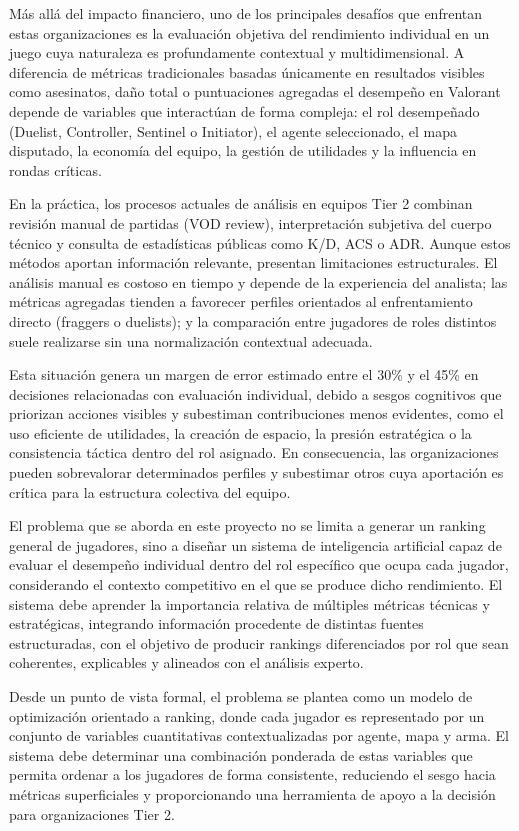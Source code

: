 \documentclass{ULBreport} %
\begin{document}
Más allá del impacto financiero, uno de los principales desafíos que enfrentan estas organizaciones es la evaluación objetiva del rendimiento individual en un juego cuya naturaleza es profundamente contextual y multidimensional. A diferencia de métricas tradicionales basadas únicamente en resultados visibles como asesinatos, daño total o puntuaciones agregadas el desempeño en Valorant depende de variables que interactúan de forma compleja: el rol desempeñado (Duelist, Controller, Sentinel o Initiator), el agente seleccionado, el mapa disputado, la economía del equipo, la gestión de utilidades y la influencia en rondas críticas.

En la práctica, los procesos actuales de análisis en equipos Tier 2 combinan revisión manual de partidas (VOD review), interpretación subjetiva del cuerpo técnico y consulta de estadísticas públicas como K/D, ACS o ADR. Aunque estos métodos aportan información relevante, presentan limitaciones estructurales. El análisis manual es costoso en tiempo y depende de la experiencia del analista; las métricas agregadas tienden a favorecer perfiles orientados al enfrentamiento directo (fraggers o duelists); y la comparación entre jugadores de roles distintos suele realizarse sin una normalización contextual adecuada.

Esta situación genera un margen de error estimado entre el 30\% y el 45\% en decisiones relacionadas con evaluación individual, debido a sesgos cognitivos que priorizan acciones visibles y subestiman contribuciones menos evidentes, como el uso eficiente de utilidades, la creación de espacio, la presión estratégica o la consistencia táctica dentro del rol asignado. En consecuencia, las organizaciones pueden sobrevalorar determinados perfiles y subestimar otros cuya aportación es crítica para la estructura colectiva del equipo.

El problema que se aborda en este proyecto no se limita a generar un ranking general de jugadores, sino a diseñar un sistema de inteligencia artificial capaz de evaluar el desempeño individual dentro del rol específico que ocupa cada jugador, considerando el contexto competitivo en el que se produce dicho rendimiento. El sistema debe aprender la importancia relativa de múltiples métricas técnicas y estratégicas, integrando información procedente de distintas fuentes estructuradas, con el objetivo de producir rankings diferenciados por rol que sean coherentes, explicables y alineados con el análisis experto.

Desde un punto de vista formal, el problema se plantea como un modelo de optimización orientado a ranking, donde cada jugador es representado por un conjunto de variables cuantitativas contextualizadas por agente, mapa y arma. El sistema debe determinar una combinación ponderada de estas variables que permita ordenar a los jugadores de forma consistente, reduciendo el sesgo hacia métricas superficiales y proporcionando una herramienta de apoyo a la decisión para organizaciones Tier 2.
\end{document}
